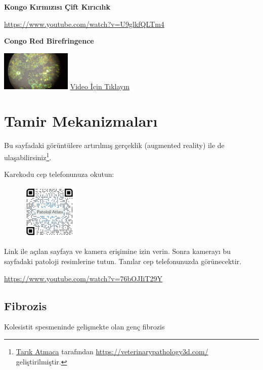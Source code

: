 \documentclass[
  letterpaper,
  DIV=11,
  numbers=noendperiod]{scrreprt}
\begin{document}
\textbf{Kongo Kırmızısı Çift Kırıcılık}

\url{https://www.youtube.com/watch?v=U9glkfQLTm4}

\textbf{Congo Red Birefringence}

\href{https://www.youtube.com/watch?v=U9glkfQLTm4}{\includegraphics[width=0.25\textwidth,height=\textheight]{./screenshots/thumbnail_congored_video.png}}
\href{https://www.youtube.com/watch?v=U9glkfQLTm4}{Video İçin Tıklayın}

\hypertarget{sec-tamir-mekanizmalari}{%
\chapter{Tamir Mekanizmaları}\label{sec-tamir-mekanizmalari}}

Bu sayfadaki görüntülere artırılmış gerçeklik (augmented reality) ile de
ulaşabilirsiniz\footnote{\href{https://github.com/veterinarypathology3d}{Tarık
  Atmaca} tarafından \url{https://veterinarypathology3d.com/}
  geliştirilmiştir.}.

Karekodu cep telefonunuza okutun:

\begin{figure}

\includegraphics[width=1.04167in,height=\textheight]{images/AR-tamir.jpeg} \hfill{}

\end{figure}

Link ile açılan sayfaya ve kamera erişimine izin verin. Sonra kamerayı
bu sayfadaki patoloji resimlerine tutun. Tanılar cep telefonunuzda
görünecektir.

\url{https://www.youtube.com/watch?v=76bOJIiT29Y}

\hypertarget{sec-fibrozis}{%
\section{Fibrozis}\label{sec-fibrozis}}

Kolesistit spesmeninde gelişmekte olan genç fibrozis
\end{document}
